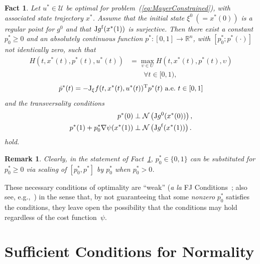 \documentclass[letterpaper,10pt,conference]{ieeeconf}
\def\R{{\mathbb{R}}}
\newtheorem{fact}{Fact}
\newtheorem{remark}{Remark} %
\begin{document}
\begin{fact}                                                   
\label{Pontryagin}
Let $u^*\in\mathcal U$ be optimal for problem~(\ref{eq:MayerConstrained}),
with associated state trajectory $x^*$.  
Assume that the initial state $\xi^0~(=x^*(0))$ is a regular point for 
$g^0$ and that ${\rm J}g^{\rm f}(x^*(1))$ is surjective.
Then there exist a constant $p_0^*\geq0$ 
and an absolutely continuous function $p^*:[0,1]\to\R^n$,
with $[p_0^*;p^*(\cdot)]$ not identically zero, such that
\[
\begin{aligned}
H(t,x^*(t),p^*(t),u^*(t))
&=\max_{\upsilon\in U}H(t,x^*(t),p^*(t),\upsilon)\\
&\qquad \forall t\in[0,1),
\end{aligned}
\]
\begin{equation}
\label{eq:costate}
\dot p^*(t) = -{\rm J}_\xi f(t,x^*(t),u^*(t))^{\rm T} p^*(t) 
~{\rm a.e.~} t\in[0,1]
\end{equation}
and the transversality conditions 
\[
\begin{aligned}
p^*(0)&\perp{\mathcal N}\left({\rm J}g^0(x^*(0))\right),\\
p^*(1)+p_0^*\nabla\psi(x^*(1))
&\perp{\mathcal N}\left({\rm J}g^{\rm f}(x^*(1))\right).
\end{aligned}
\]
hold.
\end{fact}
\begin{remark}
Clearly, in the statement of Fact~\ref{Pontryagin}, $p_0^*\in\{0,1\}$ can
be substituted for $p_0^*\geq0$ via scaling of $[p_0^*,p^*]$ by $p_0^*$
when $p_0^*>0$.
\end{remark}

\noindent
These necessary conditions of optimality are ``weak'' 
({\sl a la} FJ Conditions~\cite{john1948extremum}; also see, 
e.g.,~\cite[section 3.3.5]{Bertsekas1999}) in the sense that, 
by not guaranteeing that some {\em nonzero} $p_0^*$ satisfies the conditions,
they leave open the possibility that the conditions may hold regardless of 
the cost function~$\psi$. 

\section{Sufficient Conditions for Normality} 
\label{sec:p0NOT0}
\end{document}
